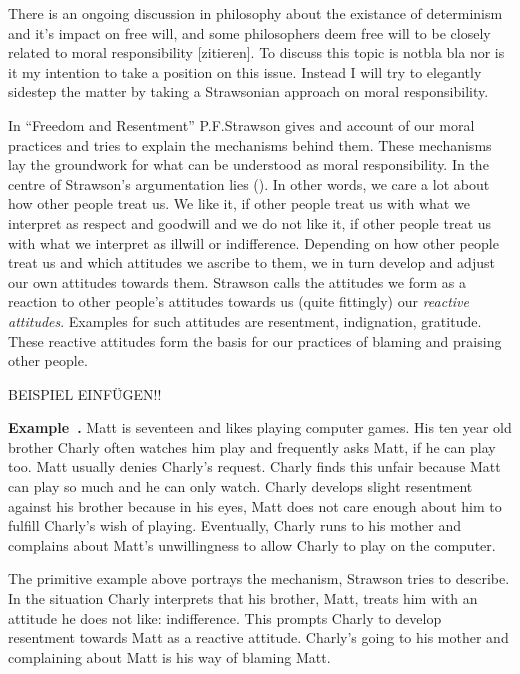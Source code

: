 \documentclass{article}
\newcounter{example}[section]
\newenvironment{example}[1][]{\refstepcounter{example}\par\medskip
   \noindent \textbf{Example~\theexample. #1} \rmfamily}{\medskip}
\begin{document}
There is an ongoing discussion in philosophy about the existance of determinism
and it's impact on free will, and some philosophers deem free will to be closely related to
moral responsibility [zitieren]. To discuss this topic is notbla bla nor is it
my intention to take a position on this issue. Instead I will try to elegantly
sidestep the matter by taking a Strawsonian approach on moral responsibility.

In ``Freedom and Resentment'' P.F.Strawson gives and account of our moral
practices and tries to explain the mechanisms behind them. These mechanisms lay
the groundwork for what can be understood as moral responsibility.
In the centre of Strawson's argumentation lies (\cite[p.5]{Strawson1962}). In other words, we care a lot about how other
people treat us. We like it, if other people treat us with what we interpret as
respect and goodwill and we do not like it, if other people treat us with what
we interpret as illwill or indifference. Depending on how other people treat us
and which attitudes we ascribe to them, we in turn develop and adjust our own
attitudes towards them. Strawson calls the attitudes we form as a reaction to
other people's attitudes towards us (quite fittingly) our \textit{reactive
attitudes}. Examples for such attitudes are resentment, indignation, gratitude.
These reactive attitudes form the basis for our practices of blaming and
praising other people.

BEISPIEL EINFÜGEN!!


\begin{example}
	Matt is seventeen and likes playing computer games. His ten year old brother
	Charly often watches him play and frequently asks Matt, if he can play
	too. Matt usually denies Charly's request. Charly finds this unfair
	because Matt can play so much and he can only watch. Charly develops
	slight resentment against his brother because in his eyes, Matt
	does not care enough about him to fulfill Charly's wish of playing.
	Eventually, Charly runs to his mother and complains about Matt's
	unwillingness to allow Charly to play on the computer.
\end{example}

The primitive example above portrays the mechanism, Strawson tries to describe.
In the situation Charly interprets that his brother, Matt, treats him with an
attitude he does not like: indifference. This prompts Charly to develop
resentment towards Matt as a reactive attitude. Charly's going to his mother and
complaining about Matt is his way of blaming Matt.
\end{document}
